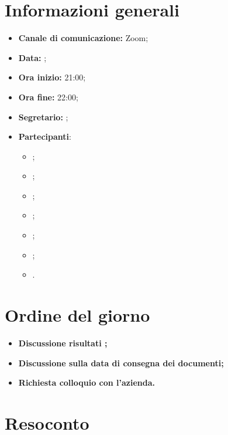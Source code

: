 \section{Informazioni generali}

\begin{itemize}

    \item \textbf{Canale di comunicazione:} Zoom;

    \item \textbf{Data:} \DataMeeting{};

    \item \textbf{Ora inizio:} 21:00;

    \item \textbf{Ora fine:} 22:00;

    \item \textbf{Segretario:} \ACapoRedazione{};

    \item \textbf{Partecipanti}:
        \begin{itemize}
            \item \Daniele{};
            \item \Davide{};
            \item \Francesco{};
            \item \Giosue{};
            \item \Lucrezia{};
            \item \Matteo{};
            \item \Tommaso{}.
        \end{itemize}
\end{itemize}

\section{Ordine del giorno}

\begin{itemize}
    \item\textbf{Discussione risultati \PB{};}
    \item\textbf{Discussione sulla data di consegna dei documenti;}
    \item\textbf{Richiesta colloquio con l'azienda.}
\end{itemize}
\newpage


\section{Resoconto}

